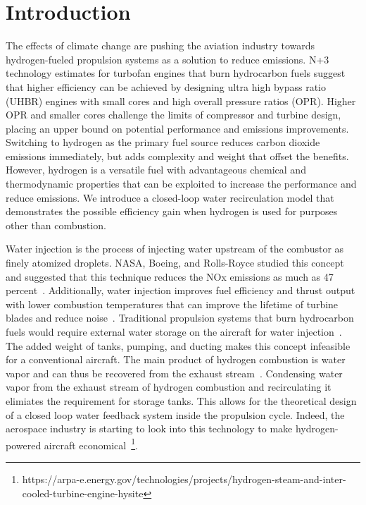 \documentclass[conf]{new-aiaa}
\begin{document}
\section{Introduction}
The effects of climate change are pushing the aviation industry towards hydrogen-fueled propulsion systems as a solution to reduce emissions.
N+3 technology estimates for turbofan engines that burn hydrocarbon fuels suggest that higher efficiency can be achieved by designing ultra high bypass ratio (UHBR) engines with small cores and high overall pressure ratios (OPR).
Higher OPR and smaller cores challenge the limits of compressor and turbine design, placing an upper bound on potential performance and emissions improvements.
Switching to hydrogen as the primary fuel source reduces carbon dioxide emissions immediately, but adds complexity and weight that offset the benefits.
However, hydrogen is a versatile fuel with advantageous chemical and thermodynamic properties that can be exploited to increase the performance and reduce emissions.
We introduce a closed-loop water recirculation model that demonstrates the possible efficiency gain when hydrogen is used for purposes other than combustion.

Water injection is the process of injecting water upstream of the combustor as finely atomized droplets.
NASA, Boeing, and Rolls-Royce studied this concept and suggested that this technique reduces the NOx emissions as much as 47 percent~\cite{Daggett2010}.
Additionally, water injection improves fuel efficiency and thrust output with lower combustion temperatures that can improve the lifetime of turbine blades and reduce noise~\cite{Daggett2010}.
Traditional propulsion systems that burn hydrocarbon fuels would require external water storage on the aircraft for water injection~\cite{Mourouzidis2015}.
The added weight of tanks, pumping, and ducting makes this concept infeasible for a conventional aircraft.
The main product of hydrogen combustion is water vapor and can thus be recovered from the exhaust stream~\cite{Strom2002}.
Condensing water vapor from the exhaust stream of hydrogen combustion and recirculating it elimiates the requirement for storage tanks.
This allows for the theoretical design of a closed loop water feedback system inside the propulsion cycle.
Indeed, the aerospace industry is starting to look into this technology to make hydrogen-powered aircraft economical~\footnote{https://arpa-e.energy.gov/technologies/projects/hydrogen-steam-and-inter-cooled-turbine-engine-hysite}.
\end{document}
